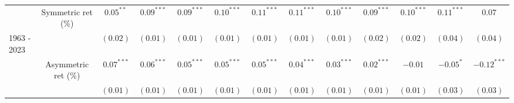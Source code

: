 \begin{tabular}{lcccccccccccc}
   & Symmetric ret (\%) & $0.05^{**}$ & $0.09^{***}$ & $0.09^{***}$ & $0.10^{***}$ & $0.11^{***}$ & $0.11^{***}$ & $0.10^{***}$ & $0.09^{***}$ & $0.10^{***}$ & $0.11^{***}$ & $0.07$ \\ 
   \vspace{5pt}1963 - 2023 &  & $(0.02)$ & $(0.01)$ & $(0.01)$ & $(0.01)$ & $(0.01)$ & $(0.01)$ & $(0.01)$ & $(0.02)$ & $(0.02)$ & $(0.04)$ & $(0.04)$ \\ 
   & Asymmetric ret (\%) & $0.07^{***}$ & $0.06^{***}$ & $0.05^{***}$ & $0.05^{***}$ & $0.05^{***}$ & $0.04^{***}$ & $0.03^{***}$ & $0.02^{***}$ & $-0.01$ & $-0.05^{*}$ & $-0.12^{***}$ \\ 
   \vspace{5pt} &  & $(0.01)$ & $(0.01)$ & $(0.01)$ & $(0.01)$ & $(0.01)$ & $(0.01)$ & $(0.01)$ & $(0.01)$ & $(0.01)$ & $(0.03)$ & $(0.03)$ \\ 
   \bottomrule 
\end{tabular}
